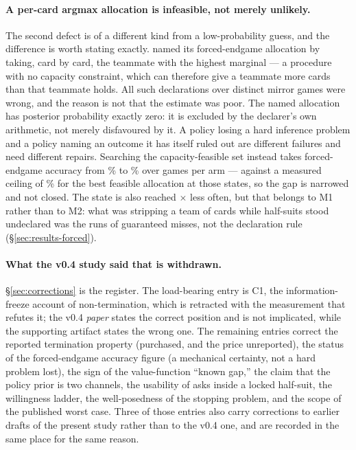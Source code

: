 \paragraph{A per-card argmax allocation is infeasible, not merely unlikely.}
The second defect is of a different kind from a low-probability guess, and the
difference is worth stating exactly. \vfour{} named its forced-endgame
allocation by taking, card by card, the teammate with the highest marginal ---
a procedure with no capacity constraint, which can therefore give a teammate
more cards than that teammate holds. All \numForcedN{} such declarations over
\numForcedGames{} distinct mirror games were wrong, and the reason is not that
the estimate was poor. The named allocation has posterior probability exactly
zero: it is excluded by the declarer's own arithmetic, not merely disfavoured by
it. A policy losing a hard inference problem and a policy naming an outcome it
has itself ruled out are different failures and need different repairs. Searching
the capacity-feasible set instead takes forced-endgame accuracy from
\numVfourForcedAcc\% to \numVfiveForcedAcc\% over \numForcedEightGames{} games
per arm --- against a measured ceiling of \numFeasibleRight\% for the best
feasible allocation at those states, so the gap is narrowed and not closed. The
state is also reached \numForcedRateRatio$\times$ less often, but that belongs to
M1 rather than to M2: what was stripping a team of cards while half-suits stood
undeclared was the runs of guaranteed misses, not the declaration rule
(\S\ref{sec:results-forced}).

\paragraph{What the v0.4 study said that is withdrawn.}
\S\ref{sec:corrections} is the register. The load-bearing entry is C1, the
information-freeze account of non-termination, which is retracted with the
measurement that refutes it; the v0.4 \emph{paper} states the correct position
and is not implicated, while the supporting artifact states the wrong one. The
remaining entries correct the reported termination property (purchased, and the
price unreported), the status of the forced-endgame accuracy figure (a
mechanical certainty, not a hard problem lost), the sign of the value-function
``known gap,'' the claim that the policy prior is two channels, the usability of
asks inside a locked half-suit, the willingness ladder, the well-posedness of the
stopping problem, and the scope of the published worst case. Three of those
entries also carry corrections to earlier drafts of the present study rather
than to the v0.4 one, and are recorded in the same place for the same reason.

